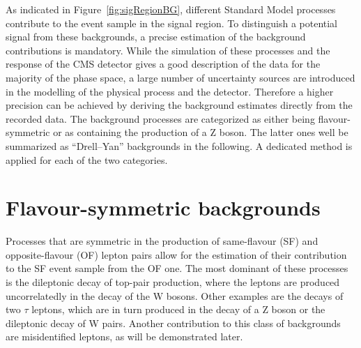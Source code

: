 As indicated in Figure~\ref{fig:sigRegionBG}, different Standard Model processes contribute to the event sample in the signal region. To distinguish a potential signal from these backgrounds, a precise estimation of the background contributions is mandatory. While the simulation of these processes and the response of the CMS detector gives a good description of the data for the majority of the phase space, a large number of uncertainty sources are introduced in the modelling of the physical process and the detector. Therefore a higher precision can be achieved by deriving the background estimates directly from the recorded data. The background processes are categorized as either being flavour-symmetric or as containing the production of a Z boson. The latter ones well be summarized as ``Drell--Yan'' backgrounds in the following. A dedicated method is applied for each of the two categories.

\section{Flavour-symmetric backgrounds}
Processes that are symmetric in the production of same-flavour (SF) and opposite-flavour (OF) lepton pairs allow for the estimation of their contribution to the SF event sample from the OF one. The most dominant of these processes is the dileptonic decay of top-pair production, where the leptons are produced uncorrelatedly in the decay of the W bosons. Other examples are the decays of two $\tau$ leptons, which are in turn produced in the decay of a Z boson or the dileptonic decay of W pairs. Another contribution to this class of backgrounds are misidentified leptons, as will be demonstrated later. 

